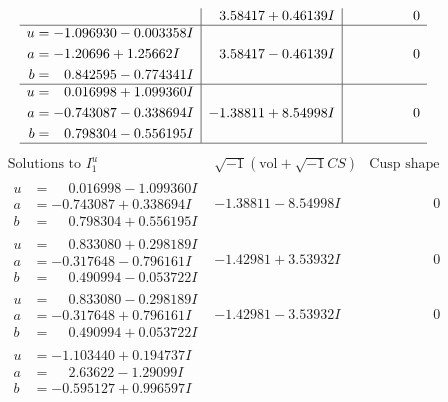 \documentclass[1p]{elsarticle_modified}
\theoremstyle{definition}
\newcommand{\I}{\sqrt{-1}}
\begin{document}
$$\begin{array}{c|c|c}
 & \phantom{-}3.58417 + 0.46139 I & \phantom{-0.000000 } 0 \\ \hline\begin{aligned}
u &= -1.096930 - 0.003358 I \\
a &= -1.20696 + 1.25662 I \\
b &= \phantom{-}0.842595 - 0.774341 I\end{aligned}
 & \phantom{-}3.58417 - 0.46139 I & \phantom{-0.000000 } 0 \\ \hline\begin{aligned}
u &= \phantom{-}0.016998 + 1.099360 I \\
a &= -0.743087 - 0.338694 I \\
b &= \phantom{-}0.798304 - 0.556195 I\end{aligned}
 & -1.38811 + 8.54998 I & \phantom{-0.000000 } 0\\
 \hline 
 \end{array}$$\newpage$$\begin{array}{c|c|c}  
\text{Solutions to }I^u_{1}& \I (\text{vol} + \sqrt{-1}CS) & \text{Cusp shape}\\
 \hline 
\begin{aligned}
u &= \phantom{-}0.016998 - 1.099360 I \\
a &= -0.743087 + 0.338694 I \\
b &= \phantom{-}0.798304 + 0.556195 I\end{aligned}
 & -1.38811 - 8.54998 I & \phantom{-0.000000 } 0 \\ \hline\begin{aligned}
u &= \phantom{-}0.833080 + 0.298189 I \\
a &= -0.317648 - 0.796161 I \\
b &= \phantom{-}0.490994 - 0.053722 I\end{aligned}
 & -1.42981 + 3.53932 I & \phantom{-0.000000 } 0 \\ \hline\begin{aligned}
u &= \phantom{-}0.833080 - 0.298189 I \\
a &= -0.317648 + 0.796161 I \\
b &= \phantom{-}0.490994 + 0.053722 I\end{aligned}
 & -1.42981 - 3.53932 I & \phantom{-0.000000 } 0 \\ \hline\begin{aligned}
u &= -1.103440 + 0.194737 I \\
a &= \phantom{-}2.63622 - 1.29099 I \\
b &= -0.595127 + 0.996597 I\end{aligned}

\end{array}$$
\end{document}
